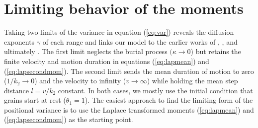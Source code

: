\documentclass[]{agujournal2018}
\begin{document}
\section{Limiting behavior of the moments}
\label{sec:appendixC}
Taking two limits of the variance in equation (\ref{eq:var}) reveals the diffusion exponents $\gamma$ of each range and links our model to the earlier works of \cite{Wu2019}, \citet{Lisle1998}, and ultimately \citet{Einstein1937}.
The first limit neglects the burial process $(\kappa \rightarrow 0$) but retains the finite velocity and motion duration in equations (\ref{eq:lapmean}) and (\ref{eq:lapsecondmom}).
The second limit sends the mean duration of motion to zero ($1/k_2\rightarrow 0$) and the velocity to infinity ($v\rightarrow \infty$) while holding the mean step distance $l = v/k_2$ constant.
In both cases, we mostly use the initial condition that grains start at rest ($\theta_1=1$).
The easiest approach to find the limiting form of the positional variance is to use the Laplace transformed moments (\ref{eq:lapmean}) and (\ref{eq:lapsecondmom}) as the starting point.
\end{document}
